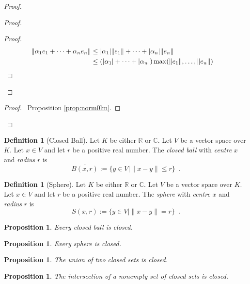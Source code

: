 \documentclass{book}
\let\qed\relax
\newtheorem{prop}[ax]{Proposition}
\theoremstyle{definition}
\newtheorem{df}[ax]{Definition}
\begin{document}
\begin{proof}
\begin{proof}
	\begin{proof}
		\pf
		\begin{align*}
			\| \alpha_1 e_1 + \cdots + \alpha_n e_n \|
			& \leq |\alpha_1| \| e_1 \| + \cdots + |\alpha_n| \|e_n\| \\
			& \leq (|\alpha_1| + \cdots + |\alpha_n|) \max(\|e_1\|, \ldots, \|e_n\|) & \qed
		\end{align*}
	\end{proof}
\end{proof}
\begin{proof}
	\pf\ Proposition \ref{prop:norm0lm}.
\end{proof}
\qed
\end{proof}

\begin{df}[Closed Ball]
Let $K$ be either $\mathbb{R}$ or $\mathbb{C}$. Let $V$ be a vector space over $K$. Let $x \in V$ and let $r$ be a positive real number. The \emph{closed ball} with \emph{centre} $x$ and \emph{radius} $r$ is
\[ \overline{B(x,r)} := \{ y \in V \mid \| x - y \| \leq r \} \enspace . \]
\end{df}

\begin{df}[Sphere]
Let $K$ be either $\mathbb{R}$ or $\mathbb{C}$. Let $V$ be a vector space over $K$. Let $x \in V$ and let $r$ be a positive real number. The \emph{sphere} with \emph{centre} $x$ and \emph{radius} $r$ is
\[ S(x,r) := \{ y \in V \mid \| x - y \| = r \} \enspace . \]
\end{df}

\begin{prop}
\label{prop:closedball}
Every closed ball is closed.
\end{prop}

\begin{prop}
Every sphere is closed.
\end{prop}

\begin{prop}
The union of two closed sets is closed.
\end{prop}

\begin{prop}
The intersection of a nonempty set of closed sets is closed.
\end{prop}
\end{document}
